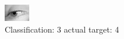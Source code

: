 \begin{figure}[h!]
\begin{center}
\includegraphics[width=0.60\columnwidth]{figures/ID2994_class_3_target_4.png}
\end{center}
\caption{ Classification: 3 actual target: 4}
\label{fig:ID2994_class_3_target_4}
\end{figure}
